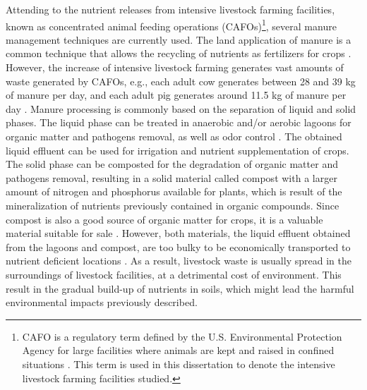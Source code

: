 \begin{refsection}[referencesCh1]
Attending to the nutrient releases from intensive livestock farming facilities, known as concentrated animal feeding operations (CAFOs)\footnote{CAFO is a regulatory term defined by the U.S. Environmental Protection Agency for large facilities where animals are kept and raised in confined situations \citep{animal_unit_definition}. This term is used in this dissertation to denote the intensive livestock farming facilities studied.}, several manure management techniques are currently used. The land application of manure is a common technique that allows the recycling of nutrients as fertilizers for crops \citep{Kellog2010}. However, the increase of intensive livestock farming generates vast amounts of waste generated by CAFOs, e.g., each adult cow generates between 28 and 39 kg of manure per day, and each adult pig generates around 11.5 kg of manure per day \citep{USDAHandbook}. Manure processing is commonly based on the separation of liquid and solid phases. The liquid phase can be treated in anaerobic and/or aerobic lagoons for organic matter and pathogens removal, as well as odor control \citep{tilley2014compendium}. The obtained liquid effluent can be used for irrigation and nutrient supplementation of crops. The solid phase can be composted for the degradation of organic matter and pathogens removal, resulting in a solid material called compost with a larger amount of nitrogen and phosphorus available for plants, which is result of the mineralization of nutrients previously contained in organic compounds. Since compost is also a good source of organic matter for crops, it is a valuable material suitable for sale \citep{tilley2014compendium}. However, both materials, the liquid effluent obtained from the lagoons and compost, are too bulky to be economically transported to nutrient deficient locations \citep{burns2002phosphorus}. As a result, livestock waste is usually spread in the surroundings of livestock facilities, at a detrimental cost of environment. This result in the gradual build-up of nutrients in soils, which might lead the harmful environmental impacts previously described.


\end{refsection}
